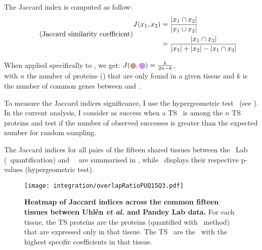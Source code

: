 \begin{minipage}{\textwidth}
    The Jaccard index is computed as follow:
\begin{equation}
    \tag{Jaccard similarity coefficient}\label{eq:Jaccard}
    \begin{split}
        J(x_{1},x_{2}) & = \frac{\left | x_{1}\cap  x_{2}\right |}%
                                {\left | x_{1}\cup  x_{2}\right |}\\
                       & = \frac{\left | x_{1}\cap  x_{2}\right |}%
                                {\left | x_{1} \right | + \left | x_{2} \right |%
                                - \left | x_{1}\cap  x_{2}\right |}\\
    \end{split}
    \raisetag{6cm}
\end{equation}

When applied specifically to , we get:
$J(\tikzcircle[Tan,fill={rgb,255:red,195; green,160;blue,153}]{4pt},%
\tikzcircle[DarkOrchid,fill={rgb,255:red,215; green,145; blue,254}]{4pt}) = \frac{k}{2n-k}$,\\
with $n$ the number of proteins (\tikzcircle[Tan,fill={rgb,255:red,195; green,160;blue,153}]{4pt})
that are only found in a given tissue and
$k$ is the number of common genes between \tikzcircle[Tan,fill={rgb,255:red,195; green,160;blue,153}]{4pt}
and \tikzcircle[DarkOrchid,fill={rgb,255:red,215; green,145; blue,254}]{4pt}.
\end{minipage}

\vspace{3mm}
To measure the Jaccard indices significance,
I use the hypergeometric test~
(see ).
In the current analysis,
I consider as success when a \gls{TS} \mRNA\ is among the $n$ \gls{TS} proteins
and test if the number of observed successes is greater than
the expected number for random sampling.\mybr\

\vspace{3mm}
The Jaccard indices for all pairs of the fifteen shared tissues
between the \pandey\ Lab (\PPKM\ quantification) and \uhlen\ \etal\
are summarised in ,
while~ displays
their respective p-values (hypergeometric test).\mybr\

\begin{figure}[!ht]
    \texttt{[image: integration/overlapRatioPUQ15Q3.pdf]}\centering
    \caption[Heatmap of Jaccard indices across 15 tissues]{%
\label{fig:JaccardIndexes}\label{fig:RatioJac}\textbf{Heatmap of Jaccard indices
across the common fifteen tissues between Uhlén \textit{et al.} and Pandey Lab data.}
For each tissue, the \gls{TS} proteins are the proteins
(quantified with \PPKM\ method) that are expressed only in that tissue.
The \gls{TS} \mRNAs\ are the \mRNAs\ with the highest specific coefficients
in that tissue.}
\end{figure}

